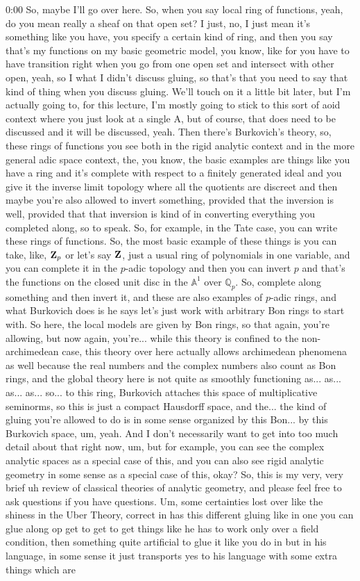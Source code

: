 \begin{unfinished}{0:00}
So, maybe I'll go over here. So, when you say local ring of functions, yeah, do you mean really a sheaf on that open set? I just, no, I just mean it's something like you have, you specify a certain kind of ring, and then you say that's my functions on my basic geometric model, you know, like for you have to have transition right when you go from one open set and intersect with other open, yeah, so I what I didn't discuss gluing, so that's that you need to say that kind of thing when you discuss gluing. We'll touch on it a little bit later, but I'm actually going to, for this lecture, I'm mostly going to stick to this sort of aoid context where you just look at a single A, but of course, that does need to be discussed and it will be discussed, yeah. Then there's Burkovich's theory, so, these rings of functions you see both in the rigid analytic context and in the more general adic space context, the, you know, the basic examples are things like you have a ring and it's complete with respect to a finitely generated ideal and you give it the inverse limit topology where all the quotients are discreet and then maybe you're also allowed to invert something, provided that the inversion is well, provided that that inversion is kind of in converting everything you completed along, so to speak. So, for example, in the Tate case, you can write these rings of functions. So, the most basic example of these things is you can take, like, $\mathbf Z_p$ or let's say $\mathbf Z$, just a usual ring of polynomials in one variable, and you can complete it in the $p$-adic topology and then you can invert $p$ and that's the functions on the closed unit disc in the $\mathbb{A}^1$ over $\mathbb{Q}_p$. So, complete along something and then invert it, and these are also examples of $p$-adic rings, and what Burkovich does is he says let's just work with arbitrary Bon rings to start with. So here, the local models are given by Bon rings, so that again, you're allowing, but now again, you're... while this theory is confined to the non-archimedean case, this theory over here actually allows archimedean phenomena as well because the real numbers and the complex numbers also count as Bon rings, and the global theory here is not quite as smoothly functioning as... as... as... as... so... to this ring, Burkovich attaches this space of multiplicative seminorms, so this is just a compact Hausdorff space, and the... the kind of gluing you're allowed to do is in some sense organized by this Bon... by this Burkovich space, um, yeah. And I don't necessarily want to get into too much detail about that right now, um, but for example, you can see the complex analytic spaces as a special case of this, and you can also see rigid analytic geometry in some sense as a special case of this, okay? So, this is my very, very brief uh review of classical theories of analytic geometry, and please feel free to ask questions if you have questions. Um, some certainties lost over like the shiness in the Uber Theory, correct in has this different gluing like in one you can glue along op get to get to get things like he has to work only over a field condition, then something quite artificial to glue it like you do in but in his language, in some sense it just transports yes to his language with some extra things which are 
\end{unfinished}
